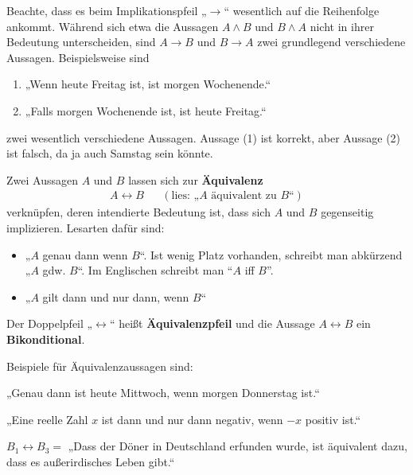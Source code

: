 \begin{bem}
    Beachte, dass es beim Implikationspfeil „$\to$“ wesentlich auf die Reihenfolge ankommt. Während sich etwa die Aussagen $A\land B$ und $B\land A$ nicht in ihrer Bedeutung unterscheiden, sind $A\to B$ und $B\to A$ zwei grundlegend verschiedene Aussagen. Beispielsweise sind
    \begin{enumerate}[(1)]
        \item „Wenn heute Freitag ist, ist morgen Wochenende.“
        \item „Falls morgen Wochenende ist, ist heute Freitag.“
    \end{enumerate}
    zwei wesentlich verschiedene Aussagen. Aussage (1) ist korrekt, aber Aussage (2) ist falsch, da ja auch Samstag sein könnte.
\end{bem}


\begin{defin}[Äquivalenz] 
    Zwei Aussagen $A$ und $B$ lassen sich zur \textbf{Äquivalenz}
    \begin{align*}
        A\leftrightarrow B  && (\text{lies: „$A$ äquivalent zu $B$“})
    \end{align*}
    verknüpfen, deren intendierte Bedeutung ist, dass sich $A$ und $B$ gegenseitig implizieren. Lesarten dafür sind:
    \begin{itemize}
        \item „$A$ genau dann wenn $B$“. Ist wenig Platz vorhanden, schreibt man abkürzend „$A$ gdw. $B$“. Im Englischen schreibt man ``$A$ iff $B$''.
        \item „$A$ gilt dann und nur dann, wenn $B$“
    \end{itemize}
    Der Doppelpfeil „$\leftrightarrow$“ heißt \textbf{Äquivalenzpfeil} und die Aussage $A\leftrightarrow B$ ein \textbf{Bikonditional}.
\end{defin}

    
\begin{bsp}
    Beispiele für Äquivalenzaussagen sind:
    \begin{labeling}[resume*=propbsp]
        \item[\hfill\textbullet] „Genau dann ist heute Mittwoch, wenn morgen Donnerstag ist.“
        \item[\hfill\textbullet] „Eine reelle Zahl $x$ ist dann und nur dann negativ, wenn $-x$ positiv ist.“
        \item[$B_1\leftrightarrow B_3=$] „Dass der Döner in Deutschland erfunden wurde, ist äquivalent dazu, dass es außerirdisches Leben gibt.“
    \end{labeling}
\end{bsp}


